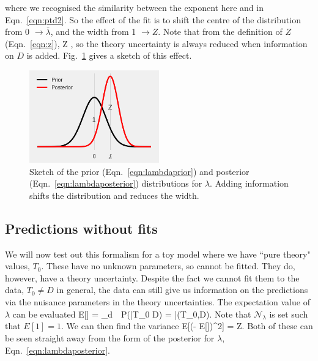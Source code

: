 \ee
where we recognised the similarity between the exponent here and in Eqn.~\ref{eqn:ptd2}. So the effect of the fit is to shift the centre of the distribution from 0 $\to \bar{\lambda}$, and the width from 1 $\to Z$. Note that from the definition of $Z$ (Eqn.~\ref{eqn:z}), 
 \le Z ,
\ee
so the theory uncertainty is always reduced when information on $D$ is added. Fig.~\ref{fig:lambdadistribs} gives a sketch of this effect.  
\begin{figure}[H]
  \begin{center}
      \includegraphics[width=0.5\textwidth]{correlations/plots/lambdapriorpost.png}
    \caption{Sketch of the prior (Eqn.~\ref{eqn:lambdaprior}) and posterior (Eqn.~\ref{eqn:lambdaposterior}) distributions for $\lambda$. Adding information shifts the distribution and reduces the width. \label{fig:lambdadistribs}}
    
  \end{center}
\end{figure}

\subsection{Predictions without fits}
We will now test out this formalism for a toy model where we have ``pure theory" values, $T_0$. These have no unknown parameters, so cannot be fitted. They do, however, have a theory uncertainty. Despite the fact we cannot fit them to the data, $T_0 \neq D$ in general, the data can still give us information on the predictions via the nuisance parameters in the theory uncertainties. The expectation value of $\lambda$ can be evaluated 
\be
E[\lambda] = _\lambda \int d\lambda \ \lambda\ P(\lambda |T_0 D) = \bar{\lambda}(T_0,D).
\ee
Note that $\mathcal{N}_\lambda$ is set such that $E[1]=1$. We can then find the variance
\be 
\Var[\lambda] \equiv E[(\lambda - E[\lambda])^2] = Z.
\ee
Both of these can be seen straight away from the form of the posterior for $\lambda$, Eqn.~\ref{eqn:lambdaposterior}.


